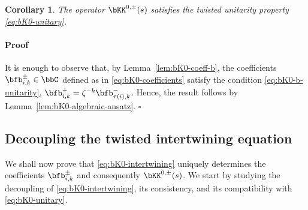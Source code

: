 \documentclass[reqno]{amsart}
\numberwithin{equation}{section}
\newtheorem*{corollary}{Corollary}
\newenvironment{pf}{\medskip\paragraph{{\sc Proof}}}{\hfill$\square$\par\medskip}
\begin{document}
\begin{corollary}\label{cor:bK0-algebraic-ansatz}
The operator $\bKK^{0,\pm}(s)$ satisfies the twisted unitarity property \eqref{eq:bK0-unitary}.	
\end{corollary}
\begin{pf}
It is enough to observe that, by Lemma~\ref{lem:bK0-coeff-b}, the coefficients $\bfb_{i,k}^\pm\in\bbC$ defined  as in \eqref{eq:bK0-coefficients} satisfy the condition  \eqref{eq:bK0-b-unitarity}, \ie $\bfb_{i,k}^{+}=\zeta^{-k}\bfb_{\tau(i),k}^{-}$. 
Hence, the result follows by Lemma~\ref{lem:bK0-algebraic-ansatz}.
\end{pf}

\subsection{Decoupling the twisted intertwining equation}\label{ss:bK0-intertwining}
We shall now prove that \eqref{eq:bK0-intertwining} uniquely determines the coefficients $\bfb_{i,k}^\pm$ and consequently $\bKK^{0,\pm}(s)$. We start by studying the decoupling of \eqref{eq:bK0-intertwining}, its consistency, and its compatibility with \eqref{eq:bK0-unitary}.
\end{document}
